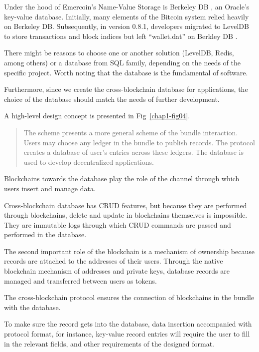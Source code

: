 \begin{multicols}{2}
Under the hood of Emercoin’s Name-Value Storage is Berkeley DB \cite{art1-key36}, an Oracle’s key-value database. Initially, many elements of the Bitcoin system relied heavily on Berkeley DB. Subsequently, in version 0.8.1, developers migrated to LevelDB \cite{art1-key37} to store transactions and block indices but left “wallet.dat” on Berkley DB \cite{art1-key38}. 

There might be reasons to choose one or another solution (LevelDB, Redis, among others) or a database from SQL family, depending on the needs of the specific project. Worth noting that the database is the fundamental of software.

Furthermore, since we create the cross-blockchain database for applications, the choice of the database should match the needs of further development.

A high-level design concept is presented in Fig~\ref{chap1-fig04}.

\begin{quote}
The scheme presents a more general scheme of the bundle interaction. Users may choose any ledger in the bundle to publish records. The protocol creates a database of user’s entries across these ledgers. The database is used to develop decentralized applications. 
\end{quote}

Blockchains towards the database play the role of the channel through which users insert and manage data.
 
Cross-blockchain database has CRUD features, but because they are performed through blockchains, delete and update in blockchains themselves is impossible. They are immutable logs through which CRUD commands are passed and performed in the database.

The second important role of the blockchain is a mechanism of ownership because records are attached to the addresses of their users. Through the native blockchain mechanism of addresses and private keys, database records are managed and transferred between users as tokens.

The cross-blockchain protocol ensures the connection of blockchains in the bundle with the database.

To make sure the record gets into the database, data insertion accompanied with protocol format, for instance, key-value record entries will require the user to fill in the relevant fields, and other requirements of the designed format.


\end{multicols}
